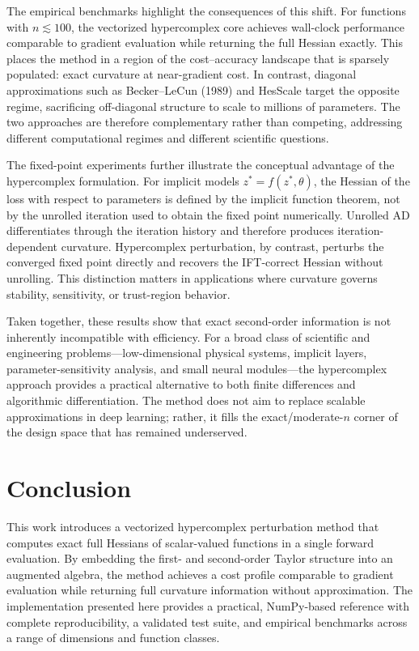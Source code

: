The empirical benchmarks highlight the consequences of this shift. For functions with
$n \lesssim 100$, the vectorized hypercomplex core achieves wall-clock performance
comparable to gradient evaluation while returning the full Hessian exactly. This
places the method in a region of the cost--accuracy landscape that is sparsely
populated: exact curvature at near-gradient cost. In contrast, diagonal approximations
such as Becker--LeCun (1989) and HesScale \citep{elsayed2024} target the opposite
regime, sacrificing off-diagonal structure to scale to millions of parameters. The two
approaches are therefore complementary rather than competing, addressing different
computational regimes and different scientific questions.

The fixed-point experiments further illustrate the conceptual advantage of the
hypercomplex formulation. For implicit models $z^* = f(z^*, \theta)$, the Hessian of
the loss with respect to parameters is defined by the implicit function theorem, not
by the unrolled iteration used to obtain the fixed point numerically. Unrolled AD
differentiates through the iteration history and therefore produces
iteration-dependent curvature. Hypercomplex perturbation, by contrast, perturbs the
converged fixed point directly and recovers the IFT-correct Hessian without
unrolling. This distinction matters in applications where curvature governs stability,
sensitivity, or trust-region behavior.

Taken together, these results show that exact second-order information is not
inherently incompatible with efficiency. For a broad class of scientific and
engineering problems---low-dimensional physical systems, implicit layers,
parameter-sensitivity analysis, and small neural modules---the hypercomplex approach
provides a practical alternative to both finite differences and algorithmic
differentiation. The method does not aim to replace scalable approximations in deep
learning; rather, it fills the exact/moderate-$n$ corner of the design space that has
remained underserved.



\section{Conclusion}

This work introduces a vectorized hypercomplex perturbation method that computes exact
full Hessians of scalar-valued functions in a single forward evaluation. By embedding
the first- and second-order Taylor structure into an augmented algebra, the method
achieves a cost profile comparable to gradient evaluation while returning full
curvature information without approximation. The implementation presented here
provides a practical, NumPy-based reference with complete reproducibility, a validated
test suite, and empirical benchmarks across a range of dimensions and function
classes.


